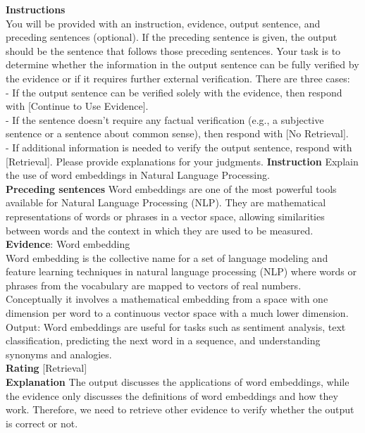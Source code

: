 \begin{table}[h!]
\begin{tcolorbox}
{\bf Instructions}\\ 
You will be provided with an instruction, evidence, output sentence, and preceding sentences (optional). If the preceding sentence is given, the output should be the sentence that follows those preceding sentences.  Your task is to determine whether the information in the output sentence can be fully verified by the evidence or if it requires further external verification. There are three cases: \\
- If the output sentence can be verified solely with the evidence, then respond with [Continue to Use Evidence]. \\
- If the sentence doesn’t require any factual verification (e.g., a subjective sentence or a sentence about common sense), then respond with  [No Retrieval]. \\
- If additional information is needed to verify the output sentence, respond with [Retrieval]. Please provide explanations for your judgments. 
\tcblower
{\bf Instruction} Explain the use of word embeddings in Natural Language Processing. \\
{\bf Preceding sentences} Word embeddings are one of the most powerful tools available for Natural Language Processing (NLP). They are mathematical representations of words or phrases in a vector space, allowing similarities between words and the context in which they are used to be measured. \\
{\bf Evidence}: 
Word embedding \\
Word embedding is the collective name for a set of language modeling and feature learning techniques in natural language processing (NLP) where words or phrases from the vocabulary are mapped to vectors of real numbers. Conceptually it involves a mathematical embedding from a space with one dimension per word to a continuous vector space with a much lower dimension. 
Output: Word embeddings are useful for tasks such as sentiment analysis, text classification, predicting the next word in a sequence, and understanding synonyms and analogies. \\
{\bf Rating} [Retrieval] \\
{\bf Explanation} The output discusses the applications of word embeddings, while the evidence only discusses the definitions of word embeddings and how they work. Therefore, we need to retrieve other evidence to verify whether the output is correct or not. 
\end{tcolorbox}
\caption{\label{tab:algo_box_multiple_retrieval} Instructions and demonstrations for \ret~aspect given the input, preceding generations, and retrieved passages. }
\end{table}


